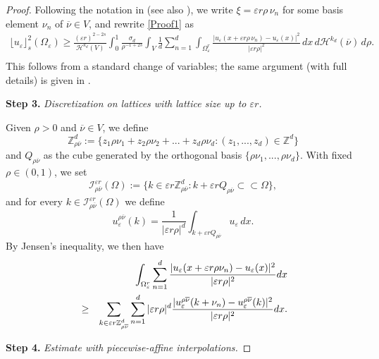 \documentclass[11pt]{article}
\def\e{\varepsilon}
\begin{document}
\begin{proof}
Following the notation in \cite[page 3445]{Solci-vortices} (see also \cite[Remark 5]{BBD}), we write $\xi=\varepsilon r\rho\,\nu_n$ for some basis element $\nu_n$ of $\overline{\nu}\in V$, and rewrite \eqref{Proof1} as
\begin{eqnarray}\label{Proof2}
\lfloor u_\varepsilon\rfloor_s^2(\Omega_\varepsilon)
\geq
\frac{(\varepsilon r)^{2-2s}}{\mathcal{H}^{k_d}(V)}
\int_0^1 \frac{\sigma_d}{\rho^{-1+2s}}
\int_V \frac{1}{d}\sum_{n=1}^d
\int_{\Omega_\varepsilon^r}
\frac{\bigl|u_\varepsilon(x+\varepsilon r\rho\,\nu_n)-u_\varepsilon(x)\bigr|^2}{|\varepsilon r\rho|^2}
\,dx\, d\mathcal{H}^{k_d}(\overline{\nu})\, d\rho .\nonumber\\
\end{eqnarray}
This follows from a standard change of variables; the same argument (with full details) is given in \cite[Section 3.1]{BBD}.

\medskip
{\bf Step 3.} {\em Discretization on lattices with lattice size up to $\e r$.}

\smallskip
Given $\rho>0$ and $\overline{\nu}\in V$, we define $$\mathbb Z^d_{\rho\overline{\nu}}:=\{z_1\rho\nu_1+z_2\rho\nu_2+...+z_d\rho\nu_d : (z_1,...,z_d)\in \mathbb Z^d\}$$ and $Q_{\rho\overline{\nu}}$ as the cube generated by the orthogonal basis $\{\rho\nu_1,...,\rho\nu_d\}$. With fixed $\rho\in(0,1)$, we set 
\[
\mathcal{I}^{\e r}_{\rho\overline{\nu}}(\Omega):=\{k\in \e r\mathbb Z_{\rho\overline{\nu}}^d : k+\e r Q_{\rho\overline{\nu}} \subset \subset \Omega\},
\]
and for every $k\in \mathcal{I}^{\e r}_{\rho\overline{\nu}}(\Omega)$ we define
    \[
    u_\e^{\rho\overline{\nu}}(k)= \displaystyle \frac{1}{|\e r\rho|^d}\int_{k+\e rQ_{\rho\overline{\nu}}} u_\e\,dx.
\] 
By Jensen's inequality, we then have
\begin{eqnarray*}\nonumber
&&\hskip-2cm\int_{\Omega_\e^r}\sum_{n=1}^d\frac{|u_\e(x+\e r\rho\nu_n)-u_\e(x)|^2}{|\e r\rho|^2} dx\\
 &\ge&\sum_{k\in \e r \mathbb Z^d_{\rho\overline{\nu}}}\sum_{n=1}^d|\e r\rho|^d\frac{|u_\e^{\rho\overline{\nu}}(k+\nu_n)-u_\e^{\rho\overline{\nu}}(k)|^2}{|\e r\rho|^2} dx.
\end{eqnarray*}


{\bf Step 4.} {\em Estimate with piecewise-affine interpolations.}


\end{proof}
\end{document}
